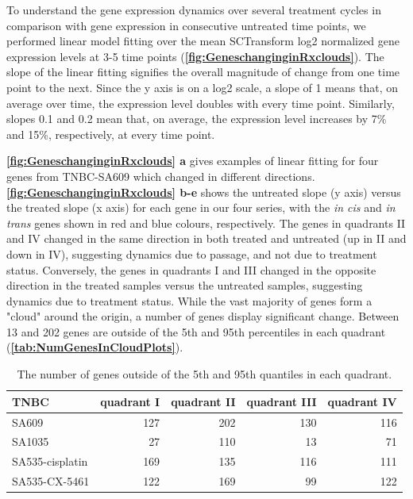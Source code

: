 To understand the gene expression dynamics over several treatment cycles in comparison with gene expression in consecutive untreated time points, we performed linear model fitting over the mean SCTransform log2 normalized gene expression levels at 3-5 time points (\textbf{\autoref{fig:GeneschanginginRxclouds}}). The slope of the linear fitting signifies the overall magnitude of change from one time point to the next. Since the y axis is on a log2 scale, a slope of 1 means that, on average over time, the expression level doubles with every time point. Similarly, slopes 0.1 and 0.2 mean that, on average, the expression level increases by 7\% and 15\%, respectively, at every time point.

\textbf{\autoref{fig:GeneschanginginRxclouds} a} gives examples of linear fitting for four genes from TNBC-SA609 which changed in different directions. \textbf{\autoref{fig:GeneschanginginRxclouds} b-e} shows the untreated slope (y axis) versus the treated slope (x axis) for each gene in our four series, with the \textit{in cis} and \textit{in trans} genes shown in red and blue colours, respectively. The genes in quadrants II and IV changed in the same direction in both treated and untreated (up in II and down in IV), suggesting dynamics due to passage, and not due to treatment status. Conversely, the genes in quadrants I and III changed in the opposite direction in the treated samples versus the untreated samples, suggesting dynamics due to treatment status. While the vast majority of genes form a "cloud" around the origin, a number of genes display significant change. Between 13 and 202 genes are outside of the 5th and 95th percentiles in each quadrant (\textbf{\autoref{tab:NumGenesInCloudPlots}}).


\begin{table}[tbp]
\centering
   \caption{The number of genes outside of the 5th and 95th quantiles in each quadrant.}
{
\begin{tabular}{|lrrrr|}
\hline
   TNBC & quadrant I & quadrant II & quadrant III & quadrant IV\\
\hline
SA609   &     127    &     202    &      130    &     116\\
SA1035  &       27   &      110   &        13   &       71\\
SA535-cisplatin  &      169   &      135   &       116    &     111 \\
SA535-CX-5461    &    122    &     169     &      99    &     122\\
\hline
\end{tabular}%

\label{tab:NumGenesInCloudPlots}
}
\end{table}


